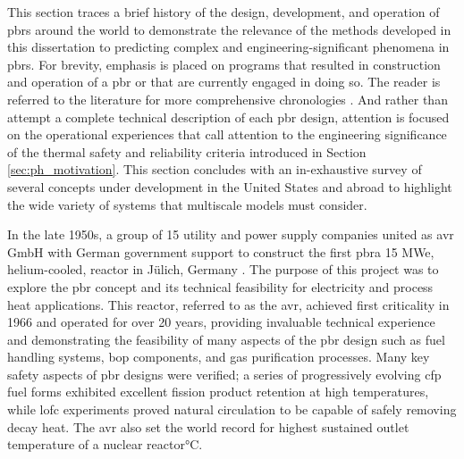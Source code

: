 This section traces a brief history of the design, development, and operation of \glspl{pbr} around the world to demonstrate the relevance of the methods developed in this dissertation to predicting complex and engineering-significant phenomena in \glspl{pbr}. For brevity, emphasis is placed on programs that resulted in construction and operation of a \gls{pbr} or that are currently engaged in doing so. The reader is referred to the literature for more comprehensive chronologies \cite{claxton,thomas}. And rather than attempt a complete technical description of each \gls{pbr} design, attention is focused on the operational experiences that call attention to the engineering significance of the thermal safety and reliability criteria introduced in Section \ref{sec:ph_motivation}. This section concludes with an in-exhaustive survey of several concepts under development in the United States and abroad to highlight the wide variety of systems that multiscale models must consider.

In the late 1950s, a group of 15 utility and power supply companies united as \gls{avr} GmbH with German government support to construct the first \gls{pbr}\mdash a 15 MWe, helium-cooled, reactor in J{\"u}lich, Germany \cite{hecker,oehme,nrc_avr,moormann}. The purpose of this project was to explore the \gls{pbr} concept and its technical feasibility for electricity and process heat applications. This reactor, referred to as the \gls{avr}, achieved first criticality in 1966 and operated for over 20 years, providing invaluable technical experience and demonstrating the feasibility of many aspects of the \gls{pbr} design such as fuel handling systems, \gls{bop} components, and gas purification processes. Many key safety aspects of \gls{pbr} designs were verified; a series of progressively evolving \gls{cfp} fuel forms exhibited excellent fission product retention at high temperatures, while \gls{lofc} experiments proved natural circulation to be capable of safely removing decay heat. The \gls{avr} also set the world record for highest sustained outlet temperature of a nuclear reactor\si{\celsius}.

